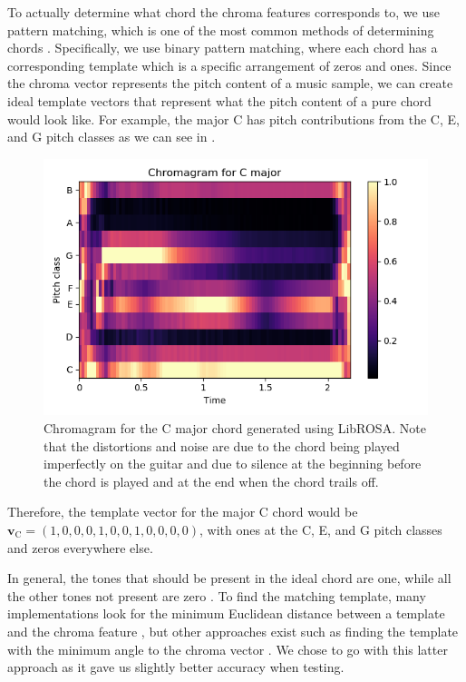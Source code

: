 \documentclass[journal]{IEEEtran}
\begin{document}
To actually determine what chord the chroma features corresponds to, we use pattern matching, which is one of the most common methods of determining chords \cite{cho_chroma}.
Specifically, we use binary pattern matching, where each chord has a corresponding template which is a specific arrangement of zeros and ones.
Since the chroma vector represents the pitch content of a music sample, we can create ideal template vectors that represent what the pitch content of a pure chord would look like.
For example, the major C has pitch contributions from the C, E, and G pitch classes as we can see in .
\begin{figure}[t]
    \centering
    \includegraphics[width = \linewidth]{../Figures/chromagram_c_major}
    \caption{Chromagram for the C major chord generated using LibROSA.
    Note that the distortions and noise are due to the chord being played imperfectly on the guitar and due to silence at the beginning before the chord is played and at the end when the chord trails off.}
    \label{fig:chroma}
\end{figure}
Therefore, the template vector for the major C chord would be $\mathbf{v}_{\text{C}} = (1, 0, 0, 0, 1, 0, 0, 1, 0, 0, 0, 0)$, with ones at the C, E, and G pitch classes and zeros everywhere else.

In general, the tones that should be present in the ideal chord are one, while all the other tones not present are zero \cite{cho_chroma}.
To find the matching template, many implementations look for the minimum Euclidean distance between a template and the chroma feature \cite{stark}, but other approaches exist such as finding the template with the minimum angle to the chroma vector \cite{jiang}.
We chose to go with this latter approach as it gave us slightly better accuracy when testing.
\end{document}
